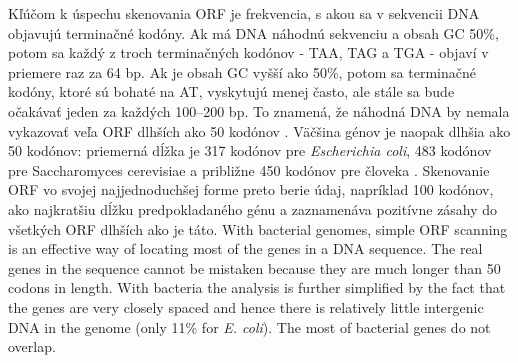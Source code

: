 Kľúčom k úspechu skenovania ORF je frekvencia, s akou sa v sekvencii DNA objavujú terminačné kodóny.
Ak má DNA náhodnú sekvenciu a obsah GC 50\%, potom sa každý z troch terminačných kodónov - TAA, TAG a TGA - objaví v priemere raz za 64 bp.
Ak je obsah GC vyšší ako 50\%, potom sa terminačné kodóny, ktoré sú bohaté na AT, vyskytujú menej často, ale stále sa bude očakávať jeden za každých 100–200 bp.
To znamená, že náhodná DNA by nemala vykazovať veľa ORF dlhších ako 50 kodónov \cite{orf}.
Väčšina génov je naopak dlhšia ako 50 kodónov: priemerná dĺžka je 317 kodónov pre \textit{Escherichia coli}, 483 kodónov pre Saccharomyces cerevisiae a približne 450 kodónov pre človeka \cite{FindingGenes}.
Skenovanie ORF vo svojej najjednoduchšej forme preto berie údaj, napríklad 100 kodónov, ako najkratšiu dĺžku predpokladaného génu a zaznamenáva pozitívne zásahy do všetkých ORF dlhších ako je táto.
With bacterial genomes, simple ORF scanning is an effective way of locating most of the genes in a DNA sequence.
The real genes in the sequence cannot be mistaken because they are much longer than 50 codons in length. 
With bacteria the analysis is further simplified by the fact that the genes are very closely spaced and hence there is relatively little intergenic DNA in the genome (only 11\% for \textit{E. coli}). 
The most of bacterial genes do not overlap.

